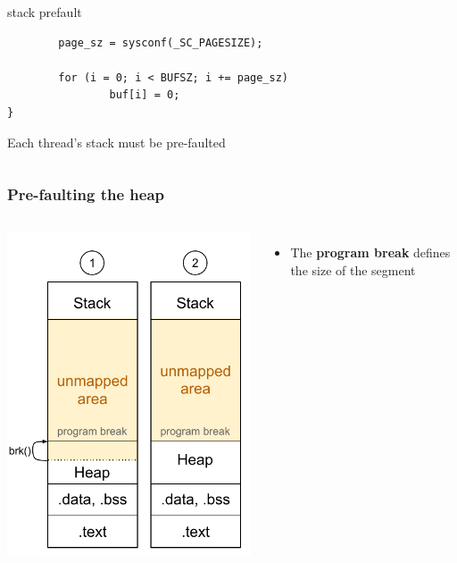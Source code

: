 \begin{frame}[fragile]
\begin{columns}
\begin{column}{0.65\textwidth}
\begin{block}{stack prefault}
\begin{verbatim}
        page_sz = sysconf(_SC_PAGESIZE);

        for (i = 0; i < BUFSZ; i += page_sz)
                buf[i] = 0;
}
				\end{verbatim}
			\end{block}
		Each thread's stack must be pre-faulted
		\end{column}
	\end{columns}

\end{frame}

\begin{frame}
	\frametitle{Pre-faulting the heap}
	\begin{columns}
    \includegraphics[width=\textwidth]{slides/realtime-linux-application-development/prefault_heap.pdf}
			\begin{itemize}
				\item The \textbf{program break} defines the size of the  segment

\end{itemize}
\end{columns}
\end{frame}
